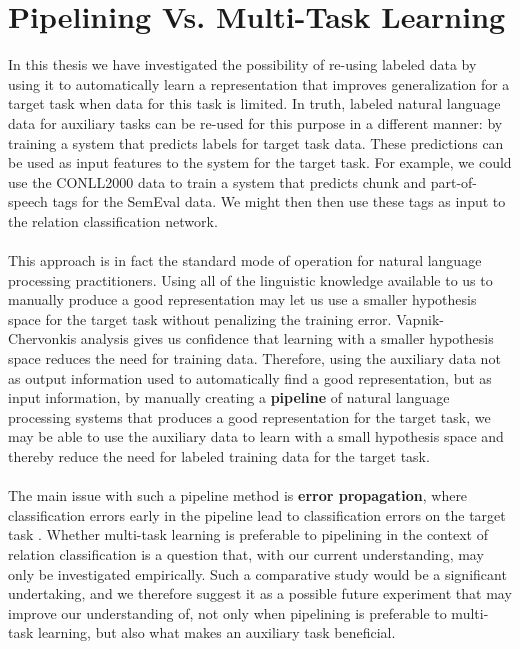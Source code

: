 \section{Pipelining Vs. Multi-Task Learning}
In this thesis we have investigated the possibility of re-using labeled data by using it to automatically learn a representation that improves generalization for a target task when data for this task is limited. In truth, labeled natural language data for auxiliary tasks can be re-used for this purpose in a different manner: by training a system that predicts labels for target task data. These predictions can be used as input features to the system for the target task. For example, we could use the CONLL2000 data to train a system that predicts chunk and part-of-speech tags for the SemEval data. We might then then use these tags as input to the relation classification network.
\\\\
This approach is in fact the standard mode of operation for natural language processing practitioners. Using all of the linguistic knowledge available to us to manually produce a good representation may let us use a smaller hypothesis space for the target task without penalizing the training error. Vapnik-Chervonkis analysis gives us confidence that learning with a smaller hypothesis space reduces the need for training data. Therefore, using the auxiliary data not as output information used to automatically find a good representation, but as input information, by manually creating a \textbf{pipeline} of natural language processing systems that produces a good representation for the target task, we may be able to use the auxiliary data to learn with a small hypothesis space and thereby reduce the need for labeled training data for the target task.
\\\\
The main issue with such a pipeline method is \textbf{error propagation}, where classification errors early in the pipeline lead to classification errors on the target task \citep{collobert2011}. Whether multi-task learning is preferable to pipelining in the context of relation classification is a question that, with our current understanding, may only be investigated empirically. Such a comparative study would be a significant undertaking, and we therefore suggest it as a possible future experiment that may improve our understanding of, not only when pipelining is preferable to multi-task learning, but also what makes an auxiliary task beneficial.

